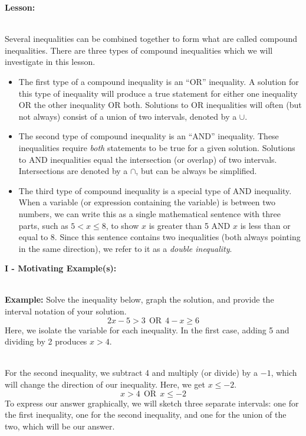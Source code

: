 \documentclass[12pt]{article}
\theoremstyle{definition}
\begin{document}
{\bf Lesson:}\\
\ \par
Several inequalities can be combined together to form what are called compound inequalities. There are three types of compound inequalities which we will investigate in this lesson.
	\begin{itemize}
		\item The first type of a compound inequality is an ``OR'' inequality. A solution for this type of inequality will produce a true statement for either one inequality OR the other inequality OR both.  Solutions to OR inequalities will often (but not always) consist of a union of two intervals, denoted by a $\cup$.
		\item The second type of compound inequality is an ``AND'' inequality. These inequalities require {\it both} statements to be true for a given solution.  Solutions to AND inequalities equal the intersection (or overlap) of two intervals.  Intersections are denoted by a $\cap$, but can be always be simplified.
		\item The third type of compound inequality is a special type of AND inequality.  When a variable (or expression containing the variable) is between two numbers, we can write this as a single mathematical sentence with three parts, such as $5 < x \leq 8$, to show $x$ is greater than 5 AND $x$ is less than or equal to 8. Since this sentence contains two inequalities (both always pointing in the same direction),  we refer to it as a {\it double inequality}.
	\end{itemize}
\newpage
{\bf I - Motivating Example(s):}\\
\ \par
{\bf Example:} Solve the inequality below, graph the solution, and provide the interval notation of your solution.
$$2 x - 5 > 3 \ \ \text{OR} \ \ 4 - x \geq 6$$
Here, we isolate the variable for each inequality.  In the first case, adding 5 and dividing by 2 produces $x>4$.\\
\ \par
For the second inequality, we subtract 4 and multiply (or divide) by a $-1$, which will change the direction of our inequality.  Here, we get $x\leq -2$.\\
$$x>4 \ \ \text{OR} \ \ x\leq-2$$
To express our answer graphically, we will sketch three separate intervals: one for the first inequality, one for the second inequality, and one for the union of the two, which will be our answer.
\end{document}
